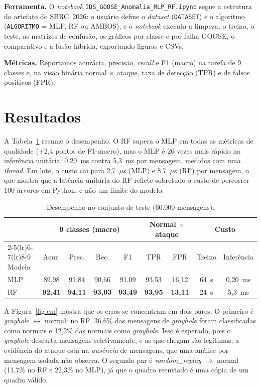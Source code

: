 \documentclass[12pt]{article}
\begin{document}
\textbf{Ferramenta.} O \textit{notebook}
\texttt{IDS\_GOOSE\_Anomalia\_MLP\_RF.ipynb} segue a estrutura do artefato do
SBRC~2026: o usuário define o \textit{dataset} (\texttt{DATASET}) e o algoritmo
(\texttt{ALGORITMO} = MLP, RF ou AMBOS), e o \textit{notebook} executa a
limpeza, o treino, o teste, as matrizes de confusão, os gráficos por classe e
por falha GOOSE, o comparativo e a fusão híbrida, exportando figuras e CSVs.

\textbf{Métricas.} Reportamos acurácia, precisão, \textit{recall} e F1
(macro) na tarefa de 9 classes e, na visão binária normal $\times$ ataque,
taxa de detecção (TPR) e de falsos positivos (FPR).

\section{Resultados}

A Tabela~\ref{tab:res} resume o desempenho. O RF supera o MLP em todas as
métricas de qualidade (+2,4 pontos de F1-macro), mas o MLP é 26 vezes mais
rápido na inferência unitária: 0,20~ms contra 5,3~ms por mensagem, medidos com
uma \textit{thread}. Em lote, o custo cai para 2,7~$\mu$s (MLP) e 8,7~$\mu$s
(RF) por mensagem, o que mostra que a latência unitária do RF reflete sobretudo
o custo de percorrer 100 árvores em Python, e não um limite do modelo.

\begin{table}[ht]
\centering
\caption{Desempenho no conjunto de teste (60.000 mensagens).}
\label{tab:res}
\small
\begin{tabular}{lcccccccc}
\toprule
& \multicolumn{4}{c}{9 classes (macro)} & \multicolumn{2}{c}{Normal $\times$ ataque} & \multicolumn{2}{c}{Custo}\\
\cmidrule(lr){2-5}\cmidrule(lr){6-7}\cmidrule(lr){8-9}
Modelo & Acur. & Prec. & Rec. & F1 & TPR & FPR & Treino & Inferência\\
\midrule
MLP & 89,98 & 91,84 & 90,66 & 91,09 & 93,53 & 16,12 & 64~s & 0,20~ms\\
RF  & \textbf{92,41} & \textbf{94,11} & \textbf{93,03} & \textbf{93,49} & \textbf{93,95} & \textbf{13,11} & 24~s & 5,3~ms\\
\bottomrule
\end{tabular}
\end{table}

A Figura~\ref{fig:cm} mostra que os erros se concentram em dois pares. O
primeiro é \textit{grayhole} $\leftrightarrow$ normal: no RF, 36,6\% das
mensagens de \textit{grayhole} foram classificadas como normais e 12,2\% das
normais como \textit{grayhole}. Isso é esperado, pois o \textit{grayhole}
descarta mensagens seletivamente, e as que chegam são legítimas; a evidência
do ataque está na \emph{ausência} de mensagens, que uma análise por mensagem
isolada não observa. O segundo par é \textit{random\_replay} $\to$ normal
(11,7\% no RF e 22,3\% no MLP), já que o quadro reenviado é uma cópia de um
quadro válido.
\end{document}
